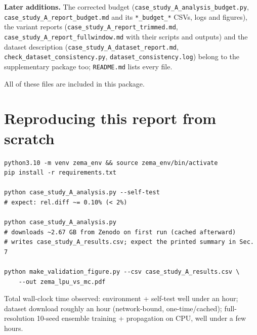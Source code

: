 \documentclass[11pt]{article}
\begin{document}
{\sloppy\textbf{Later additions.} The corrected budget
(\texttt{case\_\allowbreak study\_\allowbreak A\_\allowbreak analysis\_\allowbreak budget.py}, \texttt{case\_\allowbreak study\_\allowbreak A\_\allowbreak report\_\allowbreak budget.md} and its
\texttt{*\_budget\_*} CSVs, logs and figures), the variant reports
(\texttt{case\_\allowbreak study\_\allowbreak A\_\allowbreak report\_\allowbreak trimmed.md},
\texttt{case\_\allowbreak study\_\allowbreak A\_\allowbreak report\_\allowbreak fullwindow.md} with their scripts and outputs) and
the dataset description
(\texttt{case\_\allowbreak study\_\allowbreak A\_\allowbreak dataset\_\allowbreak report.md},
\texttt{check\_\allowbreak dataset\_\allowbreak consistency.py}, \texttt{dataset\_\allowbreak consistency.log}) belong to the
supplementary package too; \texttt{README.md} lists every file.\par}

All of these files are included in this package.

\section{Reproducing this report from scratch}
\label{sec:reproduce}

\begin{verbatim}
python3.10 -m venv zema_env && source zema_env/bin/activate
pip install -r requirements.txt

python case_study_A_analysis.py --self-test
# expect: rel.diff ~= 0.10% (< 2%)

python case_study_A_analysis.py
# downloads ~2.67 GB from Zenodo on first run (cached afterward)
# writes case_study_A_results.csv; expect the printed summary in Sec. 7

python make_validation_figure.py --csv case_study_A_results.csv \
    --out zema_lpu_vs_mc.pdf
\end{verbatim}

Total wall-clock time observed: environment + self-test well under an hour;
dataset download roughly an hour (network-bound, one-time/cached);
full-resolution 10-seed ensemble training + propagation on CPU, well under
a few hours.
\end{document}
